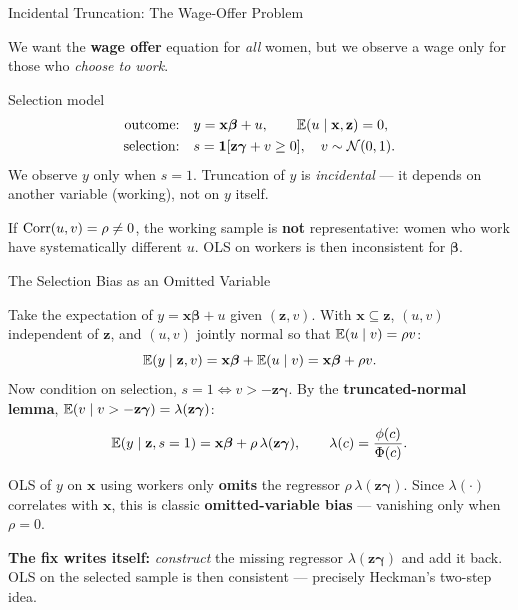 \documentclass[aspectratio=169, 12pt]{beamer}
\newcommand{\xbeta}{\mathbf{x}\boldsymbol{\beta}}   %
\begin{document}
\begin{frame}[shrink=8]{Incidental Truncation: The Wage-Offer Problem}

  We want the \textbf{wage offer} equation for \emph{all} women, but we observe a
  wage only for those who \emph{choose to work}.

  \smallskip

  \begin{definitionbox}{Selection model \citep{Heckman1979_selection}}
    \begin{align*}
      \text{outcome:}\quad & y = \xbeta + u, \qquad \E(u\mid\mathbf{x},\mathbf{z}) = 0, \\
      \text{selection:}\quad & s = \mathbf{1}[\mathbf{z}\boldsymbol\gamma + v \ge 0], \quad v\sim\Normal(0,1).
    \end{align*}
    We observe $y$ only when $s=1$. Truncation of $y$ is \emph{incidental} --- it
    depends on another variable (working), not on $y$ itself.
  \end{definitionbox}

  \smallskip

  \begin{keybox}
    If $\operatorname{Corr}(u,v) = \rho \ne 0$, the working sample is \textbf{not}
    representative: women who work have systematically different $u$. OLS on
    workers is then inconsistent for $\boldsymbol\beta$.
  \end{keybox}

\end{frame}

\begin{frame}[shrink=8]{The Selection Bias as an Omitted Variable}

  Take the expectation of $y=\xbeta+u$ given $(\mathbf{z},v)$. With
  $\mathbf{x}\subseteq\mathbf{z}$, $(u,v)$ independent of $\mathbf{z}$, and $(u,v)$
  jointly normal so that $\operatorname{\mathbb{E}}(u\mid v)=\rho v$:
  \[
    \E(y\mid\mathbf{z},v) = \xbeta + \E(u\mid v) = \xbeta + \rho v.
  \]
  Now condition on selection, $s=1 \Leftrightarrow v > -\mathbf{z}\boldsymbol\gamma$.
  By the \textbf{truncated-normal lemma}, $\operatorname{\mathbb{E}}(v\mid v>-\mathbf{z}\boldsymbol\gamma)
  = \lambda(\mathbf{z}\boldsymbol\gamma)$:
  \[
    \E(y\mid\mathbf{z}, s=1) = \xbeta + \rho\,\lambda(\mathbf{z}\boldsymbol\gamma),
    \qquad \lambda(c) = \frac{\phi(c)}{\Phi(c)} .
  \]

  \begin{highlightbox}
    \small
    OLS of $y$ on $\mathbf{x}$ using workers only \textbf{omits} the regressor
    $\rho\,\lambda(\mathbf{z}\boldsymbol\gamma)$. Since $\lambda(\cdot)$ correlates
    with $\mathbf{x}$, this is classic \textbf{omitted-variable bias} --- vanishing
    only when $\rho=0$.
  \end{highlightbox}

  \begin{keybox}
    \small
    \textbf{The fix writes itself:} \emph{construct} the missing regressor
    $\lambda(\mathbf{z}\boldsymbol\gamma)$ and add it back. OLS on the selected
    sample is then consistent --- precisely Heckman's two-step idea.
  \end{keybox}

\end{frame}
\end{document}
